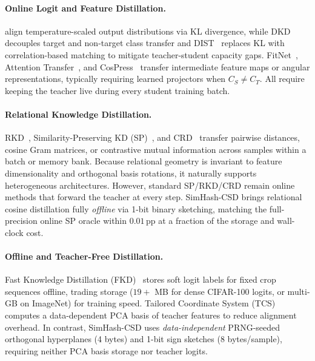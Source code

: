 \documentclass{article}
\begin{document}
\paragraph{Online Logit and Feature Distillation.}
\citet{hinton2015distilling} align temperature-scaled output distributions via KL divergence, while DKD~\citep{zhao2022dkd} decouples target and non-target class transfer and DIST~\citep{huang2022dist} replaces KL with correlation-based matching to mitigate teacher-student capacity gaps. FitNet~\citep{romero2015fitnets}, Attention Transfer~\citep{zagoruyko2017paying}, and CosPress~\citep{mannix2024preserving} transfer intermediate feature maps or angular representations, typically requiring learned projectors when $C_S \neq C_T$. All require keeping the teacher live during every student training batch.

\paragraph{Relational Knowledge Distillation.}
RKD~\citep{park2019relational}, Similarity-Preserving KD (SP)~\citep{park2019relational,tian2020crd}, and CRD~\citep{tian2020crd} transfer pairwise distances, cosine Gram matrices, or contrastive mutual information across samples within a batch or memory bank. Because relational geometry is invariant to feature dimensionality and orthogonal basis rotations, it naturally supports heterogeneous architectures. However, standard SP/RKD/CRD remain online methods that forward the teacher at every step. SimHash-CSD brings relational cosine distillation fully \emph{offline} via 1-bit binary sketching, matching the full-precision online SP oracle within $0.01$\,pp at a fraction of the storage and wall-clock cost.

\paragraph{Offline and Teacher-Free Distillation.}
Fast Knowledge Distillation (FKD)~\citep{shen2022fkd} stores soft logit labels for fixed crop sequences offline, trading storage ($19+$ MB for dense CIFAR-100 logits, or multi-GB on ImageNet) for training speed. Tailored Coordinate System (TCS)~\citep{zhou2024tcs} computes a data-dependent PCA basis of teacher features to reduce alignment overhead. In contrast, SimHash-CSD uses \emph{data-independent} PRNG-seeded orthogonal hyperplanes (4 bytes) and 1-bit sign sketches (8 bytes/sample), requiring neither PCA basis storage nor teacher logits.
\end{document}
